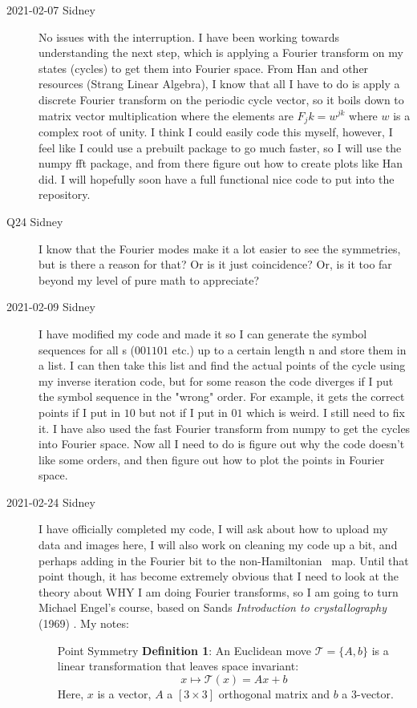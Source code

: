 \begin{description}

\item[2021-02-07 Sidney]
No issues with the interruption. I have been working towards understanding the next step, which is applying a Fourier transform on my states (cycles) to get them into Fourier space. From Han and other resources (Strang Linear Algebra), I know that all I have to do is apply a discrete Fourier transform on the periodic cycle vector, so it boils down to matrix vector multiplication where the elements are $F_jk=w^{jk}$ where $w$ is a complex root of unity. I think I could easily code this myself, however, I feel like I could use a prebuilt package to go much faster, so I will use the numpy fft package, and from there figure out how to create plots like Han did. I will hopefully soon have a full functional nice code to put into the repository.

\item[Q24 Sidney]
I know that the Fourier modes make it a lot easier to see the symmetries, but is there a reason for that? Or is it just coincidence? Or, is it too far beyond my level of pure math to appreciate?

\item[2021-02-09 Sidney]
I have modified my code and made it so I can generate the symbol sequences for all {\orbit}s ($001101$ etc.) up to a certain length n and store them in a list. I can then take this list and find the actual points of the cycle using my inverse iteration code, but for some reason the code diverges if I put the symbol sequence in the "wrong" order. For example, it gets the correct points if I put in $10$ but not if I put in $01$ which is weird. I still need to fix it. I have also used the fast Fourier transform from numpy to get the cycles into Fourier space. Now all I need to do is figure out why the code doesn't like some orders, and then figure out how to plot the points in Fourier space.

\item[2021-02-24 Sidney]
I have officially completed my code, I will ask about how to upload my
data and images here, I will also work on cleaning my code up a bit, and
perhaps adding in the Fourier bit to the non-Hamiltonian \Henon\ map.
Until that point though, it has become extremely obvious that I need to
look at the theory about WHY I am doing Fourier transforms, so I am going
to turn  {Michael Engel}'s
course, based on Sands {\em Introduction to
crystallography} (1969) .
My notes:
\begin{itemize}
\item[Point Symmetry]
\textbf{Definition 1}: An Euclidean move $\mathcal{T}=\lbrace A,b\rbrace$ is a linear transformation that leaves space invariant:
$$x\mapsto\mathcal{T}(x)=Ax+b$$
Here, $x$ is a vector, $A$ a $[3\times3]$ orthogonal matrix and $b$ a 3-vector.


\end{itemize}
\end{description}
